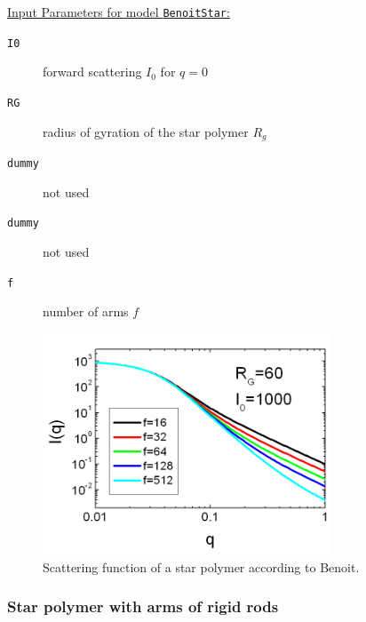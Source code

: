 \vspace{5mm}

\noindent
\underline{Input Parameters for model \texttt{BenoitStar}:}
\begin{description}
\item[\texttt{I0}] forward scattering $I_0$ for $q=0$
\item[\texttt{RG}] radius of gyration of the star polymer $R_g$
\item[\texttt{dummy}] not used
\item[\texttt{dummy}] not used
\item[\texttt{f}] number of arms $f$
\end{description}


\begin{figure}[htb]
\begin{center}
\includegraphics[width=0.768\textwidth,height=0.588\textwidth]{Benoit_Iq.png}
\end{center}
\caption{Scattering function of a star polymer according to Benoit. } \label{fig:Benoit_Iq}
\end{figure}

\clearpage


\clearpage
\subsubsection{Star polymer with arms of rigid rods}
\label{sect:StarRigidRods}
~\\
\cite{Huber1989}

